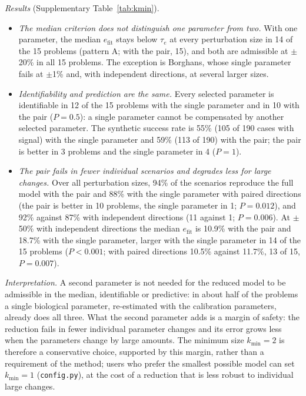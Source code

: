 \emph{Results} (Supplementary Table~\ref{tab:kmin}).
\begin{itemize}\itemsep0pt
\item \emph{The median criterion does not distinguish one parameter from two.} With one parameter, the median $e_{\mathrm{fit}}$ stays below $\tau_e$ at every perturbation size in 14 of the 15 problems (pattern A; with the pair, 15), and both are admissible at $\pm$20\% in all 15 problems. The exception is Borghans, whose single parameter fails at $\pm$1\% and, with independent directions, at several larger sizes.
\item \emph{Identifiability and prediction are the same.} Every selected parameter is identifiable in 12 of the 15 problems with the single parameter and in 10 with the pair ($P=0.5$): a single parameter cannot be compensated by another selected parameter. The synthetic success rate is 55\% (105 of 190 cases with signal) with the single parameter and 59\% (113 of 190) with the pair; the pair is better in 3 problems and the single parameter in 4 ($P=1$).
\item \emph{The pair fails in fewer individual scenarios and degrades less for large changes.} Over all perturbation sizes, 94\% of the scenarios reproduce the full model with the pair and 88\% with the single parameter with paired directions (the pair is better in 10 problems, the single parameter in 1; $P=0.012$), and 92\% against 87\% with independent directions (11 against 1; $P=0.006$). At $\pm$50\% with independent directions the median $e_{\mathrm{fit}}$ is 10.9\% with the pair and 18.7\% with the single parameter, larger with the single parameter in 14 of the 15 problems ($P<0.001$; with paired directions 10.5\% against 11.7\%, 13 of 15, $P=0.007$).
\end{itemize}

\emph{Interpretation.} A second parameter is not needed for the reduced model to be admissible in the median, identifiable or predictive: in about half of the problems a single biological parameter, re-estimated with the calibration parameters, already does all three. What the second parameter adds is a margin of safety: the reduction fails in fewer individual parameter changes and its error grows less when the parameters change by large amounts. The minimum size $k_{\min}=2$ is therefore a conservative choice, supported by this margin, rather than a requirement of the method; users who prefer the smallest possible model can set $k_{\min}=1$ (\texttt{config.py}), at the cost of a reduction that is less robust to individual large changes.

{\scriptsize\setlength{\tabcolsep}{2.5pt}

}
